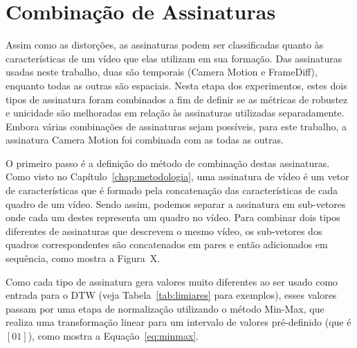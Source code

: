 \section{Combinação de Assinaturas}

Assim como as distorções, as assinaturas podem ser classificadas quanto às características de um vídeo que elas utilizam em sua formação. Das assinaturas usadas neste trabalho, duas são temporais (Camera Motion e FrameDiff), enquanto todas as outras são espaciais. Nesta etapa dos experimentos, estes dois tipos de assinatura foram combinados a fim de definir se as métricas de robustez e unicidade são melhoradas em relação às assinaturas utilizadas separadamente. Embora várias combinações de assinaturas sejam possíveis, para este trabalho, a assinatura Camera Motion foi combinada com as todas as outras. 



O primeiro passo é a definição do método de combinação destas assinaturas. Como visto no Capítulo~\ref{chap:metodologia}, uma assinatura de vídeo é um vetor de características que é formado pela concatenação das características de cada quadro de um vídeo. Sendo assim, podemos separar a assinatura em sub-vetores onde cada um destes representa um quadro no vídeo. Para combinar dois tipos diferentes de assinaturas que descrevem o mesmo vídeo, os sub-vetores dos quadros correspondentes são concatenados em pares e então adicionados em sequência, como mostra a Figura~X. 


Como cada tipo de assinatura gera valores muito diferentes ao ser usado como entrada para o DTW (veja Tabela~\ref{tab:limiares} para exemplos), esses valores passam por uma etapa de normalização utilizando o método Min-Max, que realiza uma transformação linear para um intervalo de valores pré-definido (que é $[0 1]$), como mostra a Equação~\ref{eq:minmax}.

